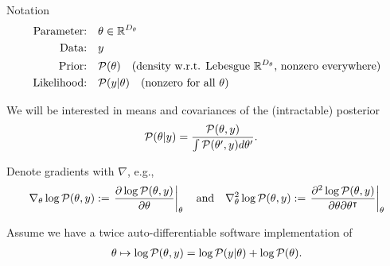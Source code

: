 \documentclass[8pt]{beamer}\usepackage[]{graphicx}\usepackage[]{color}
\begin{document}
\begin{frame}[t]{Notation}
%
%
\begin{align*}
    \text{Parameter:}& \quad \theta \in \mathbb{R}^{{D_{\theta}}}\\
    \text{Data:}&\quad y \\
    \text{Prior:}&\quad \mathcal{P}(\theta) 
        \quad \text{(density w.r.t. Lebesgue $\mathbb{R}^{D_{\theta}}$, 
            nonzero everywhere)}\\
    \text{Likelihood:}&\quad\mathcal{P}(y \vert \theta)
    \quad \text{(nonzero for all $\theta$)}\\
\end{align*}


We will be interested in means and covariances of the (intractable) posterior
%
\begin{align*}
%
\post ={}& \frac{\p(\theta, \y)}{\int \p(\theta', \y) d\theta'}.
%
\end{align*}
%


Denote gradients with $\nabla$, e.g.,
%
\begin{align*}
%
\logjointgrad := \fracat{\partial \logjoint}{\partial \theta}{\theta}
\quad\text{and}\quad
\logjointhess := \fracat{\partial^2 \logjoint}
    {\partial \theta \partial \theta^\trans}{\theta}
%
\end{align*}
%

Assume we have a twice auto-differentiable software implementation of
%
\begin{align*}
    \theta \mapsto \log \mathcal{P}(\theta, y) = \log \mathcal{P}(y \vert \theta) + \log \mathcal{P}(\theta).
\end{align*}


\end{frame}

\end{document}
